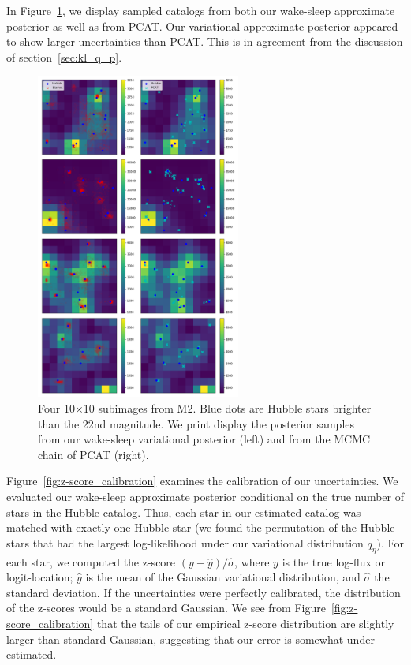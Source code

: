 In Figure~\ref{fig:example_subimages_sampled}, we display sampled catalogs from both our wake-sleep approximate posterior as well as from PCAT. Our variational approximate posterior appeared to show larger uncertainties
than PCAT. This is in agreement from the discussion of section~\ref{sec:kl_q_p}. 

\begin{figure}[h]
    \centering
    \includegraphics[width=0.6\textwidth]{figures/example_subimages_samples.png}
    \caption{Four 10$\times$10 subimages from
    M2. Blue dots are Hubble stars brighter than the 22nd magnitude.
    We print display the posterior samples from our wake-sleep variational
    posterior (left) and from the MCMC chain of PCAT (right). }
    \label{fig:example_subimages_sampled}
\end{figure}

Figure~\ref{fig:z-score_calibration} examines the calibration of our uncertainties. We evaluated our wake-sleep approximate posterior 
conditional on the true number of stars in the Hubble catalog. 
Thus, each star in our estimated catalog was matched with exactly one Hubble star (we found the permutation of the Hubble stars that had the largest log-likelihood under our variational distribution $q_\eta$). For each star, we computed the z-score $(y - \hat y) / \hat \sigma$, where $y$ is the true log-flux or 
logit-location; $\hat y$ is the mean of the Gaussian variational distribution, and $\hat\sigma$ the standard deviation.
If the uncertainties were perfectly calibrated, the distribution of the z-scores would be a standard Gaussian. 
We see from Figure~\ref{fig:z-score_calibration} that 
the tails of our empirical z-score distribution are slightly larger than standard Gaussian, suggesting that our error is somewhat under-estimated. 

